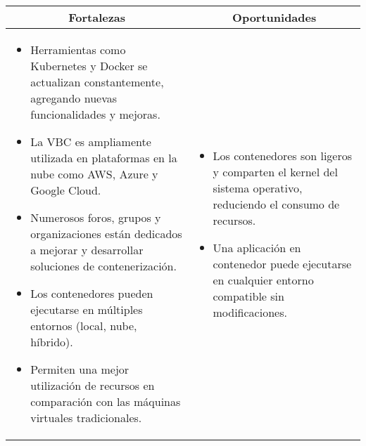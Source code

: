 \begin{table}[H]
\centering
\scriptsize
\setlength{\tabcolsep}{4pt}
\renewcommand{\arraystretch}{1.2}
\begin{tabularx}{\textwidth}{|X|X|}
\hline
\multicolumn{1}{|c|}{\textbf{Fortalezas}} & \multicolumn{1}{c|}{\textbf{Oportunidades}} \\
\hline
\begin{minipage}[t]{\dimexpr\linewidth-8mm} %
\vspace{2pt}
\begin{itemize}
    \setlength\itemsep{0pt}
    \setlength\parskip{0pt}
    \setlength\parsep{0pt}
    \item \hspace{5mm} Herramientas como Kubernetes y Docker se actualizan constantemente, agregando nuevas funcionalidades y mejoras.
    \item \hspace{5mm} La VBC es ampliamente utilizada en plataformas en la nube como AWS, Azure y Google Cloud.
    \item \hspace{5mm} Numerosos foros, grupos y organizaciones están dedicados a mejorar y desarrollar soluciones de contenerización.
    \item \hspace{5mm} Los contenedores pueden ejecutarse en múltiples entornos (local, nube, híbrido).
    \item \hspace{5mm} Permiten una mejor utilización de recursos en comparación con las máquinas virtuales tradicionales.
\end{itemize}
\vspace{2pt}
\end{minipage}
\hspace{4mm} %
&
\begin{minipage}[t]{\dimexpr\linewidth-8mm} %
\vspace{2pt}
\begin{itemize}
    \setlength\itemsep{0pt}
    \setlength\parskip{0pt}
    \setlength\parsep{0pt}
    \item \hspace{5mm} Los contenedores son ligeros y comparten el kernel del sistema operativo, reduciendo el consumo de recursos.
    \item \hspace{5mm} Una aplicación en contenedor puede ejecutarse en cualquier entorno compatible sin modificaciones.

\end{itemize}
\end{minipage}
\end{tabularx}
\end{table}
